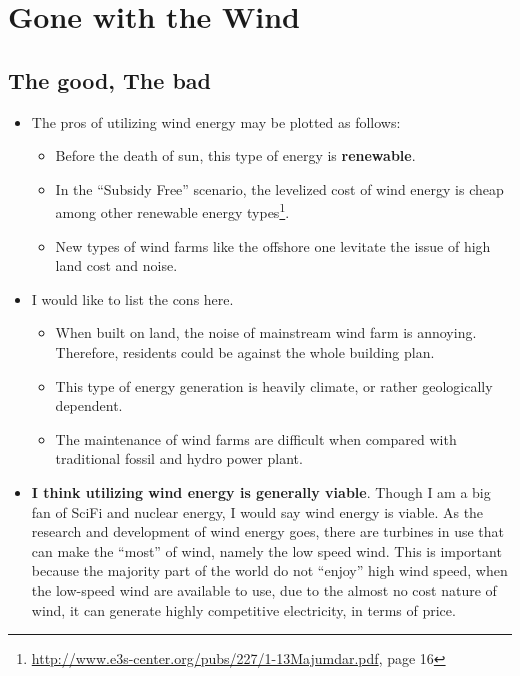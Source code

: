 \documentclass[12pt]{article}
\begin{document}
\section{Gone with the Wind}
\label{sec:it-there.-air}

\subsection{The good, The bad}
\label{sec:good-bad}

\begin{itemize}
\item The pros of utilizing wind energy may be plotted as follows:
  \begin{itemize}
  \item Before the death of sun, this type of energy is
    \textbf{renewable}.
  \item In the ``Subsidy Free'' scenario, the levelized cost of wind
    energy is cheap among other renewable energy
    types\footnote{\url{http://www.e3s-center.org/pubs/227/1-13Majumdar.pdf},
      page 16}. 
  \item New types of wind farms like the offshore one levitate the
    issue of high land cost and noise.
  \end{itemize}
\item I would like to list the cons here.
  \begin{itemize}
  \item When built on land, the noise of mainstream wind farm is
    annoying. Therefore, residents could be against the whole building
    plan. 
  \item This type of energy generation is heavily climate, or rather
    geologically dependent. 
  \item The maintenance of wind farms are difficult when compared with
    traditional fossil and hydro power plant.
  \end{itemize}
\item \textbf{I think utilizing wind energy is generally
    viable}.  Though I am a big fan of SciFi and nuclear energy, I
  would say wind energy is viable. As the research and development of
  wind energy goes, there are turbines in use that can make the
  ``most'' of wind, namely the low speed wind. This is important
  because the majority part of the world do not ``enjoy'' high wind
  speed, when the low-speed wind are available to use, due to the
  almost no cost nature of wind, it can generate highly competitive
  electricity, in terms of price.
\end{itemize}
\end{document}
